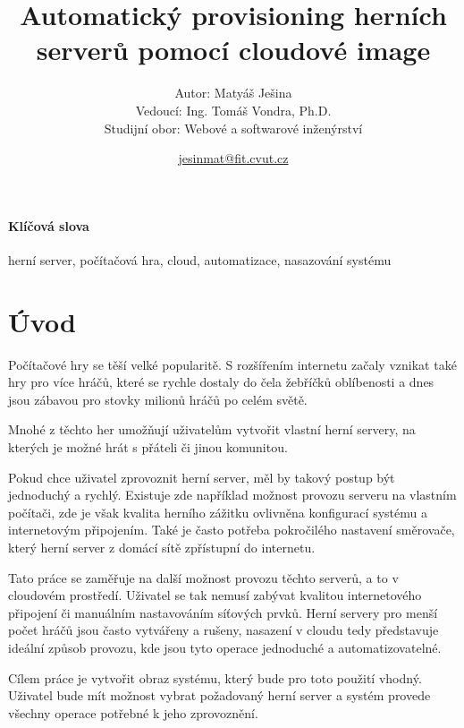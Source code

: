 \documentclass{article}
\title{Automatický provisioning herních serverů pomocí cloudové image} %
\author{\small Autor: Matyáš Ješina\\\small Vedoucí: Ing. Tomáš Vondra, Ph.D.\\ \small Studijní obor: Webové a softwarové inženýrství} %
\date{\small \url{jesinmat@fit.cvut.cz}} %
\begin{document}
\maketitle              

\paragraph{Klíčová slova}{herní server, počítačová hra, cloud, automatizace, nasazování systému}

\section{Úvod}
Počítačové hry se těší velké popularitě. S rozšířením internetu začaly vznikat také hry
pro více hráčů, které se rychle dostaly do čela žebříčků oblíbenosti a dnes jsou zábavou pro stovky milionů
hráčů po celém světě.

Mnohé z těchto her umožňují uživatelům vytvořit vlastní herní servery, na kterých je možné hrát s přáteli
či jinou komunitou.

Pokud chce uživatel zprovoznit herní server, měl by takový postup být jednoduchý a rychlý.
Existuje zde například možnost provozu serveru na vlastním počítači, zde je však kvalita herního zážitku 
ovlivněna konfigurací systému a internetovým připojením. Také je často potřeba pokročilého nastavení
směrovače, který herní server z domácí sítě zpřístupní do internetu.

Tato práce se zaměřuje na další možnost provozu těchto serverů, a to v cloudovém prostředí. Uživatel se tak nemusí zabývat 
kvalitou internetového připojení či manuálním nastavováním síťových prvků. Herní servery
pro menší počet hráčů jsou často vytvářeny a rušeny, nasazení v cloudu tedy představuje ideální způsob provozu,
kde jsou tyto operace jednoduché a automatizovatelné.

Cílem práce je vytvořit obraz systému, který bude pro toto použití vhodný. Uživatel bude mít možnost vybrat
požadovaný herní server a systém provede všechny operace potřebné k jeho zprovoznění.
\end{document}
